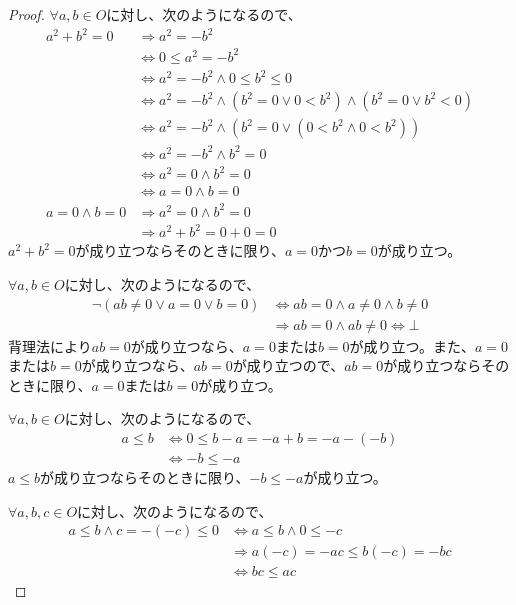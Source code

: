 \documentclass[dvipdfmx]{jsarticle}
\begin{document}
\begin{proof}
$\forall a,b \in O$に対し、次のようになるので、
\begin{align*}
a^{2} + b^{2} = 0 &\Rightarrow a^{2} = - b^{2}\\ 
&\Leftrightarrow 0 \leq a^{2} = - b^{2}\\ 
&\Leftrightarrow a^{2} = - b^{2} \land 0 \leq b^{2} \leq 0\\ 
&\Leftrightarrow a^{2} = - b^{2} \land \left( b^{2} = 0 \vee 0 < b^{2} \right) \land \left( b^{2} = 0 \vee b^{2} < 0 \right)\\ 
&\Leftrightarrow a^{2} = - b^{2} \land \left( b^{2} = 0 \vee \left( 0 < b^{2} \land 0 < b^{2} \right) \right)\\ 
&\Leftrightarrow a^{2} = - b^{2} \land b^{2} = 0\\ 
&\Leftrightarrow a^{2} = 0 \land b^{2} = 0\\ 
&\Leftrightarrow a = 0 \land b = 0\\ 
a = 0 \land b = 0 &\Rightarrow a^{2} = 0 \land b^{2} = 0\\ 
&\Rightarrow a^{2} + b^{2} = 0 + 0 = 0
\end{align*}
$a^{2} + b^{2} = 0$が成り立つならそのときに限り、$a = 0$かつ$b = 0$が成り立つ。\par
$\forall a,b \in O$に対し、次のようになるので、
\begin{align*}
\neg(ab \neq 0 \vee a = 0 \vee b = 0) &\Leftrightarrow ab = 0 \land a \neq 0 \land b \neq 0\\ 
&\Rightarrow ab = 0 \land ab \neq 0 \Leftrightarrow \bot
\end{align*}
背理法により$ab = 0$が成り立つなら、$a = 0$または$b = 0$が成り立つ。また、$a = 0$または$b = 0$が成り立つなら、$ab = 0$が成り立つので、$ab = 0$が成り立つならそのときに限り、$a = 0$または$b = 0$が成り立つ。\par
$\forall a,b \in O$に対し、次のようになるので、
\begin{align*}
a \leq b &\Leftrightarrow 0 \leq b - a = - a + b = - a - ( - b)\\ 
&\Leftrightarrow - b \leq - a
\end{align*}
$a \leq b$が成り立つならそのときに限り、$- b \leq - a$が成り立つ。\par
$\forall a,b,c \in O$に対し、次のようになるので、
\begin{align*}
a \leq b \land c = - ( - c) \leq 0 &\Leftrightarrow a \leq b \land 0 \leq - c\\ 
&\Rightarrow a( - c) = - ac \leq b( - c) = - bc\\ 
&\Leftrightarrow bc \leq ac

\end{align*}
\end{proof}
\end{document}
